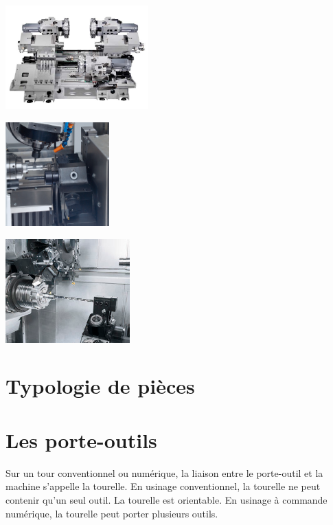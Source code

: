 \documentclass[11pt,oneside]{article}
\begin{document}
\begin{minipage}[c]{.3\linewidth}
\begin{center}
\includegraphics[height=4cm]{png/tour_multi_3}
\end{center}
\end{minipage}\hfill
\begin{minipage}[c]{.3\linewidth}
\begin{center}
\includegraphics[height=4cm]{png/tour_multi_1}
\end{center}
\end{minipage}\hfill
\begin{minipage}[c]{.3\linewidth}
\begin{center}
\includegraphics[height=4cm]{png/tour_multi_2}
\end{center}
\end{minipage}

\section{Typologie de pièces}
\section{Les porte-outils}

Sur un tour conventionnel ou numérique, la liaison entre le porte-outil et la machine s'appelle la tourelle. En usinage conventionnel, la tourelle ne peut contenir qu'un seul outil. La tourelle est orientable. En usinage à commande numérique, la tourelle peut porter plusieurs outils. 
\end{document}
